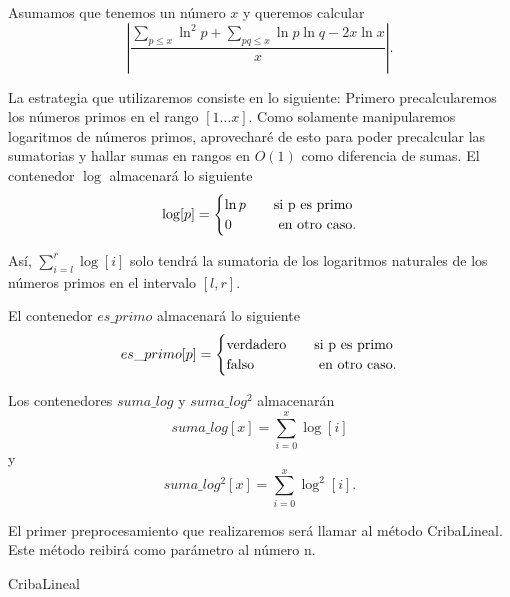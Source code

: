 \documentclass[10pt]{article}
\theoremstyle{definition}
\theoremstyle{remark}
\begin{document}
Asumamos que tenemos un n\'umero $x$ y queremos calcular
$$\left|\frac{\sum_{p \leq x} \ln^2 p + \sum_{pq \leq x} \ln p \ln q - 2x\ln x}{x}\right|.$$

La estrategia que utilizaremos consiste en lo siguiente:
Primero precalcularemos los n\'umeros primos en el rango $[1 \dots x]$.
Como solamente manipularemos logaritmos de n\'umeros primos, aprovechar\'e de esto para poder precalcular
las sumatorias y hallar sumas en rangos en $O(1)$ como diferencia de sumas.
El contenedor $\log$ almacenar\'a lo siguiente
\[
\log[p] =
\begin{cases}
\ln p &\quad\text{si }$p$\text{ es primo}\\
0 &\quad\text{ en otro caso.}
\end{cases}
\]

As\'i, $\sum_{i = l}^r \log[i]$ solo tendr\'a la sumatoria de
los logaritmos naturales de los n\'umeros primos en el intervalo $[l, r]$.

El contenedor $es\_primo$ almacenar\'a lo siguiente
\[
es\_primo[p] =
\begin{cases}
\text{verdadero} &\quad\text{si }$p$\text{ es primo}\\
\text{falso} &\quad\text{ en otro caso.}
\end{cases}
\]

Los contenedores $suma\_log$ y $suma\_log^2$ almacenar\'an
$$suma\_log[x] = \sum_{i = 0}^x \log[i]$$
y
$$suma\_log^2[x] = \sum_{i = 0}^x \log^2[i].$$

El primer preprocesamiento que realizaremos ser\'a llamar al m\'etodo CribaLineal.
Este m\'etodo reibir\'a como par\'ametro al n\'umero n. 

\begin{algorithm}[H]
\SetAlgoLined
\DontPrintSemicolon
{}
\caption{CribaLineal\label{CL}}
\end{algorithm}
\end{document}
